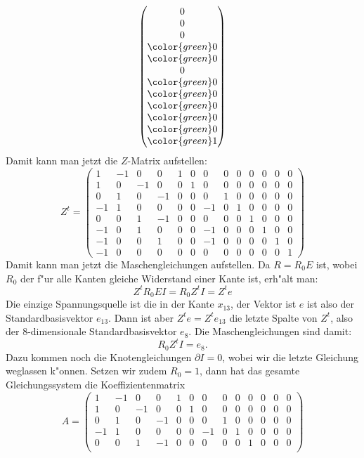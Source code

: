 \begin{loesung}
\[\begin{pmatrix}
              0\\
              0\\
              0\\
\color{green} 0\\
\color{green} 0\\
              0\\
\color{green} 0\\
\color{green} 0\\
\color{green} 0\\
\color{green} 0\\
\color{green} 0\\
\color{green} 1
\end{pmatrix}
\]
Damit kann man jetzt die $Z$-Matrix aufstellen:
\[
Z^t=\begin{pmatrix}
 1&-1& 0& 0& 1& 0& 0& 0& 0& 0& 0& 0& 0\\
 1& 0&-1& 0& 0& 1& 0& 0& 0& 0& 0& 0& 0\\
 0& 1& 0&-1& 0& 0& 0& 1& 0& 0& 0& 0& 0\\
-1& 1& 0& 0& 0& 0&-1& 0& 1& 0& 0& 0& 0\\
 0& 0& 1&-1& 0& 0& 0& 0& 0& 1& 0& 0& 0\\
-1& 0& 1& 0& 0& 0&-1& 0& 0& 0& 1& 0& 0\\
-1& 0& 0& 1& 0& 0&-1& 0& 0& 0& 0& 1& 0\\
-1& 0& 0& 0& 0& 0& 0& 0& 0& 0& 0& 0& 1
\end{pmatrix}
\]
Damit kann man jetzt die Maschengleichungen aufstellen. Da $R=R_0E$ ist,
wobei $R_0$ der f"ur alle Kanten gleiche Widerstand einer Kante ist,
erh"alt man:
\[
Z^tR_0EI=R_0Z^tI=Z^te
\]
Die einzige Spannungsquelle ist die in der Kante $x_{13}$, der Vektor
ist $e$ ist also der Standardbasisvektor $e_{13}$. Dann ist aber
$Z^te=Z^te_{13}$ die letzte Spalte von $Z^t$, also der $8$-dimensionale
Standardbasisvektor $e_{8}$. Die Maschengleichungen sind damit:
\[
R_0Z^tI=e_8.
\]
Dazu kommen noch die Knotengleichungen $\partial I=0$, wobei wir die letzte
Gleichung weglassen k"onnen. Setzen wir zudem $R_0=1$, dann hat das
gesamte Gleichungssystem die Koeffizientenmatrix
\[
A=\begin{pmatrix}
 1&-1& 0& 0& 1& 0& 0& 0& 0& 0& 0& 0& 0\\
 1& 0&-1& 0& 0& 1& 0& 0& 0& 0& 0& 0& 0\\
 0& 1& 0&-1& 0& 0& 0& 1& 0& 0& 0& 0& 0\\
-1& 1& 0& 0& 0& 0&-1& 0& 1& 0& 0& 0& 0\\
 0& 0& 1&-1& 0& 0& 0& 0& 0& 1& 0& 0& 0\\

\end{pmatrix}\]
\end{loesung}
